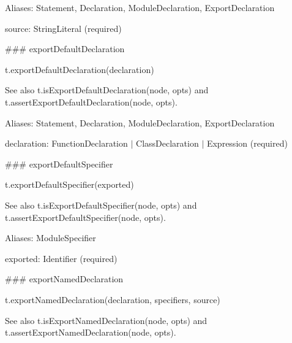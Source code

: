 Aliases\+: {\ttfamily Statement}, {\ttfamily Declaration}, {\ttfamily Module\+Declaration}, {\ttfamily Export\+Declaration}


\begin{DoxyItemize}
\item {\ttfamily source}\+: {\ttfamily String\+Literal} (required) 


\end{DoxyItemize}

\#\#\# export\+Default\+Declaration 
\begin{DoxyCode}
t.exportDefaultDeclaration(declaration)
\end{DoxyCode}


See also {\ttfamily t.\+is\+Export\+Default\+Declaration(node, opts)} and {\ttfamily t.\+assert\+Export\+Default\+Declaration(node, opts)}.

Aliases\+: {\ttfamily Statement}, {\ttfamily Declaration}, {\ttfamily Module\+Declaration}, {\ttfamily Export\+Declaration}


\begin{DoxyItemize}
\item {\ttfamily declaration}\+: {\ttfamily Function\+Declaration $\vert$ Class\+Declaration $\vert$ Expression} (required) 


\end{DoxyItemize}

\#\#\# export\+Default\+Specifier 
\begin{DoxyCode}
t.exportDefaultSpecifier(exported)
\end{DoxyCode}


See also {\ttfamily t.\+is\+Export\+Default\+Specifier(node, opts)} and {\ttfamily t.\+assert\+Export\+Default\+Specifier(node, opts)}.

Aliases\+: {\ttfamily Module\+Specifier}


\begin{DoxyItemize}
\item {\ttfamily exported}\+: {\ttfamily Identifier} (required) 


\end{DoxyItemize}

\#\#\# export\+Named\+Declaration 
\begin{DoxyCode}
t.exportNamedDeclaration(declaration, specifiers, source)
\end{DoxyCode}


See also {\ttfamily t.\+is\+Export\+Named\+Declaration(node, opts)} and {\ttfamily t.\+assert\+Export\+Named\+Declaration(node, opts)}.

